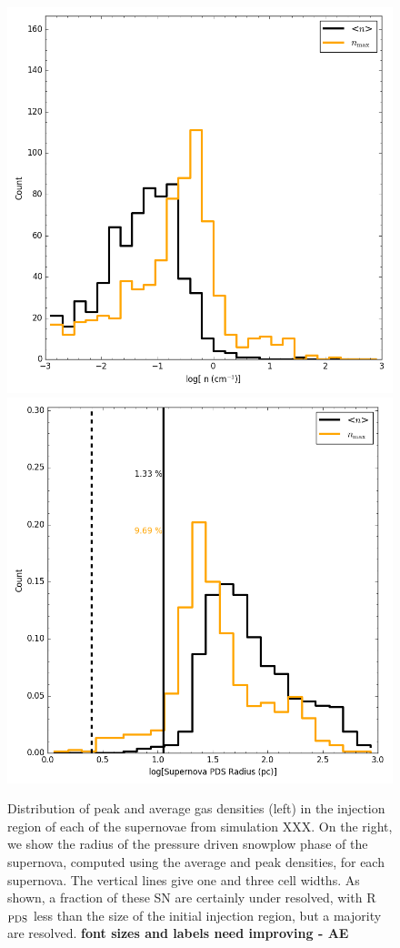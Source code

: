 \documentclass[twocolumn]{aastex61}
\begin{document}
\begin{figure}
\centering
\includegraphics[width=0.4\linewidth]{sn_density_hist}
\includegraphics[width=0.4\linewidth]{sn_radius_hist}
\caption{Distribution of peak and average gas densities (left) in the injection region of each of the supernovae from simulation XXX. On the right, we show the radius of the pressure driven snowplow phase of the supernova, computed using the average and peak densities, for each supernova. The vertical lines give one and three cell widths. As shown, a fraction of these SN are certainly under resolved, with R$_{\rm PDS}$ less than the size of the initial injection region, but a majority are resolved. \textbf{font sizes and labels need improving - AE}}
\label{fig:supernova histogram}
\end{figure}

%
%
\end{document}

